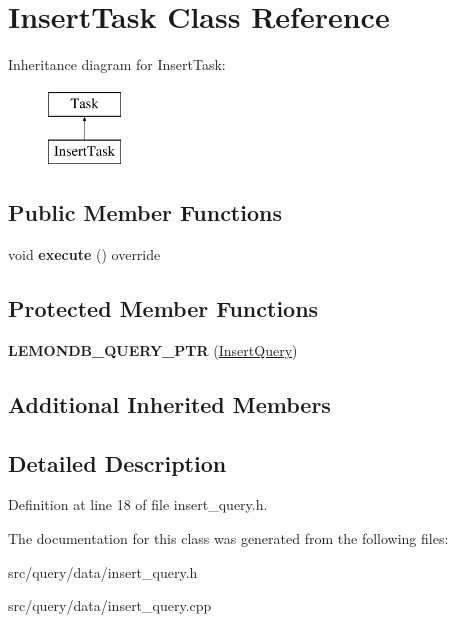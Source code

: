 \hypertarget{class_insert_task}{}\section{Insert\+Task Class Reference}
\label{class_insert_task}
Inheritance diagram for Insert\+Task\+:\begin{figure}[H]
\begin{center}
\leavevmode
\includegraphics[height=2.000000cm]{class_insert_task}
\end{center}
\end{figure}
\subsection*{Public Member Functions}
\begin{DoxyCompactItemize}
\item 
\mbox{\label{class_insert_task_a3ed29b14dbc9f4b4abf01e8db5a7b78e}} 
void {\bfseries execute} () override
\end{DoxyCompactItemize}
\subsection*{Protected Member Functions}
\begin{DoxyCompactItemize}
\item 
\mbox{\label{class_insert_task_aefda19f32cd281fce586cde640c25f34}} 
{\bfseries L\+E\+M\+O\+N\+D\+B\+\_\+\+Q\+U\+E\+R\+Y\+\_\+\+P\+TR} (\hyperlink{class_insert_query}{Insert\+Query})
\end{DoxyCompactItemize}
\subsection*{Additional Inherited Members}


\subsection{Detailed Description}


Definition at line 18 of file insert\+\_\+query.\+h.



The documentation for this class was generated from the following files\+:\begin{DoxyCompactItemize}
\item 
src/query/data/insert\+\_\+query.\+h\item 
src/query/data/insert\+\_\+query.\+cpp\end{DoxyCompactItemize}
